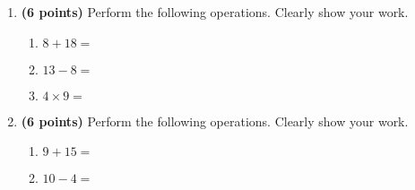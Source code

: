 \documentclass[12pt]{amsart}
\begin{document}
\newpage
\begin{enumerate}
\item {\bf (6 points)} 
 Perform the following operations. Clearly show your work. \begin{enumerate}


\def \a{8}\def \b{18}\def \apb{26}

 
\item $\a + \b = $

\vspace{2cm}
\def \a{13}\def \dif{5}\def \b{8}

 
\item $\a - \b = $

\vspace{2cm}
\def \a{4}\def \b{9}\def \ab{13}

 
\item $\a \times \b = $ 

\vspace{2cm}
\def \vshift{-3}\def \hshift{2}\def \chang{1}\def \findval{3}\def \yval{-5}

 
\end{enumerate}


\newpage
\item {\bf (6 points)} 
 Perform the following operations. Clearly show your work. \begin{enumerate}


\def \a{9}\def \b{15}\def \apb{24}

 
\item $\a + \b = $

\vspace{2cm}
\def \a{10}\def \dif{6}\def \b{4}

 
\item $\a - \b = $

\vspace{2cm}
\def \vshift{-5}\def \hshift{-4}\def \chang{-2}\def \findval{-6}\def \yval{-1}

 
\end{enumerate}


\newpage\end{enumerate} 
\end{document}
